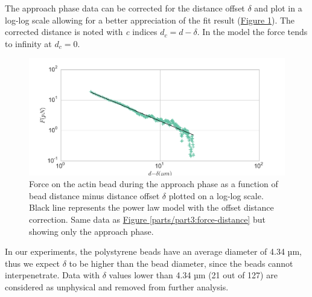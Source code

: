 \documentclass[A4paperpaper,11pt,english]{sphinxmanual}
\begin{document}
The approach phase data can be corrected for the distance offset \(\delta\)
and plot in a log-log scale allowing for a better appreciation of the fit
result (\hyperref[parts/part3:force-distance-log-log]{Figure  \ref*{parts/part3:force-distance-log-log}}). The corrected distance is noted with  \emph{c} indices \(d_c = d-
\delta\). In the model the force tends to infinity at \(d_c = 0\).
\begin{figure}[htbp]
\centering
\capstart

\includegraphics[width=0.800\linewidth]{force-distance-fit-loglog.pdf}
\caption{Force on the actin bead  during the approach phase as a function of bead distance
minus distance offset \(\delta\) plotted on a log-log scale. Black line
represents the power law model with the offset distance correction. Same
data as \hyperref[parts/part3:force-distance]{Figure  \ref*{parts/part3:force-distance}} but showing only the approach phase.}\label{parts/part3:force-distance-log-log}\end{figure}

In our experiments, the polystyrene beads have an average diameter of 4.34 µm,
thus we expect \(\delta\) to be higher than the bead diameter, since the beads cannot interpenetrate.  Data with
\(\delta\) values lower than 4.34 µm (21 out of 127) are considered as
unphysical and removed from further analysis.
\end{document}
